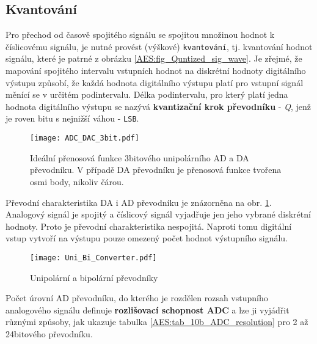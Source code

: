 {    \subsection{Kvantování}
       Pro přechod od časově spojitého signálu se spojitou množinou hodnot k číslicovému signálu, 
       je nutné provést (výškové) \texttt{kvantování}, tj. kvantování hodnot signálu, které je 
       patrné z obrázku \ref{AES:fig_Quntized_sig_wave}. Je zřejmé, že mapování spojitého intervalu 
       vstupních hodnot na diskrétní hodnoty digitálního výstupu způsobí, že každá hodnota 
       digitálního výstupu platí pro vstupní signál měnící se v určitém  podintervalu. Délka 
       podintervalu, pro který platí jedna hodnota digitálního výstupu se nazývá 
       \textbf{kvantizační krok převodníku} - \emph{Q}, jenž je roven bitu s nejnižší váhou - 
       \texttt{LSB}.

       \begin{figure}[ht!]
         \centering
         \texttt{[image: ADC\_DAC\_3bit.pdf]}
         \caption[Přenosová funkce AD a DA převodníku]{Ideální přenosová funkce 3bitového    
                  unipolárního AD a DA převodníku. V případě DA převodníku je přenosová funkce 
                  tvořena osmi body, nikoliv čárou.}
         \label{AES:fig_3b_DAC_ADC}
       \end{figure}
 
       Převodní charakteristika DA i AD převodníku je znázorněna na obr. \ref{AES:fig_3b_DAC_ADC}. 
       Analogový signál je spojitý a číslicový signál vyjadřuje jen jeho vybrané diskrétní hodnoty. 
       Proto je převodní charakteristika nespojitá. Naproti tomu digitální vstup vytvoří na výstupu 
       pouze omezený počet hodnot výstupního signálu.

       \begin{figure}[ht!]
         \centering
         \texttt{[image: Uni\_Bi\_Converter.pdf]}
         \caption[Unipolární a bipolární převodníky]{Unipolární a bipolární převodníky \cite{Kester2004}}
         \label{AES:fig_uni_bi_converter}
       \end{figure}

       Počet úrovní AD převodníku, do kterého je rozdělen rozsah vstupního analogového signálu 
       definuje \textbf{rozlišovací schopnost ADC} a lze ji vyjádřit různými způsoby, jak ukazuje 
       tabulka \ref{AES:tab_10b_ADC_resolution} pro 2 až 24bitového převodníku.

}
